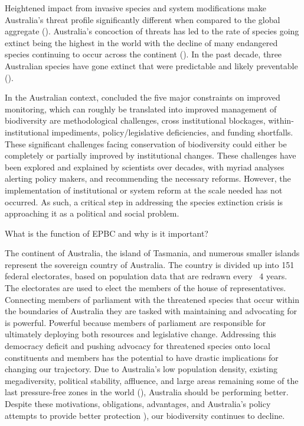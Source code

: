 \documentclass[a4paper,11pt]{article}
\begin{document}
Heightened impact from invasive species and system modifications make Australia's threat profile significantly different when compared to the global aggregate (\cite{kearneyThreatsAustraliaImperilled2019}). Australia's concoction of threats has led to the rate of species going extinct being the highest in the world with the decline of many endangered species continuing to occur across the continent (\cite{simmondsVulnerableSpeciesEcosystems2020}). In the past decade, three Australian species have gone extinct that were predictable and likely preventable (\cite{woinarskiContributionPolicyLaw2017}).

In the Australian context, \cite{leggeMonitoringThreatenedSpecies2018} concluded the five major constraints on improved monitoring, which can roughly be translated into improved management of biodiversity are methodological challenges, cross institutional blockages, within-institutional impediments, policy/legislative deficiencies, and funding shortfalls. These significant challenges facing conservation of biodiversity could either be completely or partially improved by institutional changes. These challenges have been explored and explained by scientists over decades, with myriad analyses alerting policy makers, and recommending the necessary reforms. However, the implementation of institutional or system reform at the scale needed has not occurred. As such, a critical step in addressing the species extinction crisis is approaching it as a political and social problem. 

What is the function of EPBC and why is it important?

The continent of Australia, the island of Tasmania, and numerous smaller islands represent the sovereign country of Australia. The country is divided up into 151 federal electorates, based on population data that are redrawn every ~4 years. The electorates are used to elect the members of the house of representatives.
Connecting members of parliament with the threatened species that occur within the boundaries of Australia they are tasked with maintaining and advocating for is powerful. Powerful because members of parliament are responsible for ultimately deploying both resources and legislative change.
Addressing this democracy deficit and pushing advocacy for threatened species onto local constituents and members has the potential to have drastic implications for changing our trajectory.
Due to Australia's low population density, existing megadiversity, political stability, affluence, and large areas remaining some of the last pressure-free zones in the world (\cite{venterSixteenYearsChange2016}), Australia should be performing better. Despite these motivations, obligations, advantages, and Australia's policy attempts to provide better protection \cite{wardLotsLossLittle2019}), our biodiversity continues to decline.
\end{document}

